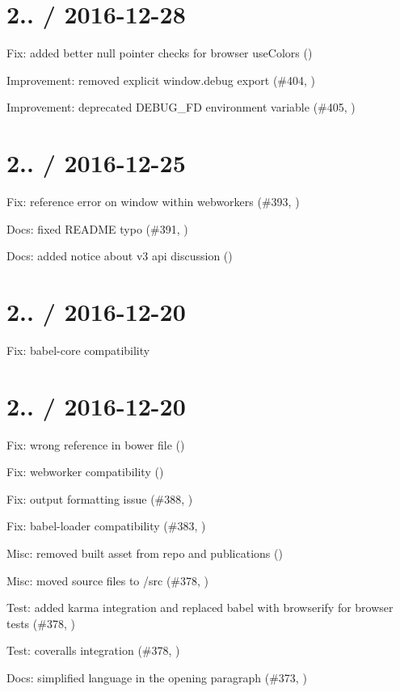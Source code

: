 \section*{2.. / 2016-\/12-\/28 }


\begin{DoxyItemize}
\item Fix\+: added better null pointer checks for browser use\+Colors ()
\item Improvement\+: removed explicit {\ttfamily window.\+debug} export (\#404, )
\item Improvement\+: deprecated {\ttfamily D\+E\+B\+U\+G\+\_\+\+FD} environment variable (\#405, )
\end{DoxyItemize}

\section*{2.. / 2016-\/12-\/25 }


\begin{DoxyItemize}
\item Fix\+: reference error on window within webworkers (\#393, )
\item Docs\+: fixed R\+E\+A\+D\+ME typo (\#391, )
\item Docs\+: added notice about v3 api discussion ()
\end{DoxyItemize}

\section*{2.. / 2016-\/12-\/20 }


\begin{DoxyItemize}
\item Fix\+: babel-\/core compatibility
\end{DoxyItemize}

\section*{2.. / 2016-\/12-\/20 }


\begin{DoxyItemize}
\item Fix\+: wrong reference in bower file ()
\item Fix\+: webworker compatibility ()
\item Fix\+: output formatting issue (\#388, )
\item Fix\+: babel-\/loader compatibility (\#383, )
\item Misc\+: removed built asset from repo and publications ()
\item Misc\+: moved source files to /src (\#378, )
\item Test\+: added karma integration and replaced babel with browserify for browser tests (\#378, )
\item Test\+: coveralls integration (\#378, )
\item Docs\+: simplified language in the opening paragraph (\#373, )
\end{DoxyItemize}

